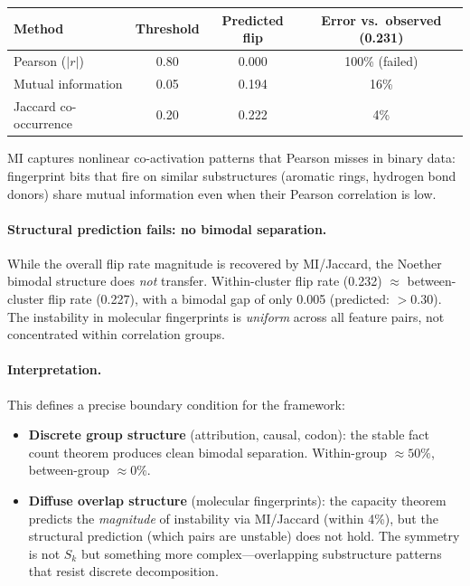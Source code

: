 \documentclass[11pt,a4paper]{article}
\begin{document}
\begin{center}
\small
\begin{tabular}{lccc}
\toprule
Method & Threshold & Predicted flip & Error vs.\ observed (0.231) \\
\midrule
Pearson ($|r|$) & 0.80 & 0.000 & 100\% (failed) \\
Mutual information & 0.05 & 0.194 & 16\% \\
Jaccard co-occurrence & 0.20 & 0.222 & 4\% \\
\bottomrule
\end{tabular}
\end{center}

MI captures nonlinear co-activation patterns that Pearson misses in binary data: fingerprint bits that fire on similar substructures (aromatic rings, hydrogen bond donors) share mutual information even when their Pearson correlation is low.

\paragraph{Structural prediction fails: no bimodal separation.}
While the overall flip rate magnitude is recovered by MI/Jaccard, the Noether bimodal structure does \emph{not} transfer. Within-cluster flip rate (0.232) $\approx$ between-cluster flip rate (0.227), with a bimodal gap of only 0.005 (predicted: $> 0.30$). The instability in molecular fingerprints is \emph{uniform} across all feature pairs, not concentrated within correlation groups.

\paragraph{Interpretation.}
This defines a precise boundary condition for the framework:
\begin{itemize}
  \item \textbf{Discrete group structure} (attribution, causal, codon): the stable fact count theorem produces clean bimodal separation. Within-group $\approx 50\%$, between-group $\approx 0\%$.
  \item \textbf{Diffuse overlap structure} (molecular fingerprints): the capacity theorem predicts the \emph{magnitude} of instability via MI/Jaccard (within 4\%), but the structural prediction (which pairs are unstable) does not hold. The symmetry is not $S_k$ but something more complex---overlapping substructure patterns that resist discrete decomposition.
\end{itemize}
\end{document}
